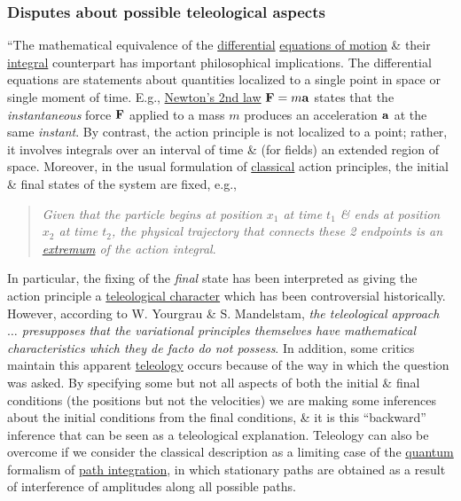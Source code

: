 \documentclass{article}
\begin{document}
\subsubsection{Disputes about possible teleological aspects}
``The mathematical equivalence of the \href{https://en.wikipedia.org/wiki/Differential_equation}{differential} \href{https://en.wikipedia.org/wiki/Equations_of_motion}{equations of motion} \& their \href{https://en.wikipedia.org/wiki/Integral_equation}{integral} counterpart has important philosophical implications. The differential equations are statements about quantities localized to a single point in space or single moment of time. E.g., \href{https://en.wikipedia.org/wiki/Newton%27s_laws_of_motion}{Newton's 2nd law} ${\bf F} = m{\bf a}$ states that the \textit{instantaneous} force ${\bf F}$ applied to a mass $m$ produces an acceleration ${\bf a}$ at the same \textit{instant}. By contrast, the action principle is not localized to a point; rather, it involves integrals over an interval of time \& (for fields) an extended region of space. Moreover, in the usual formulation of \href{https://en.wikipedia.org/wiki/Classical_physics}{classical} action principles, the initial \& final states of the system are fixed, e.g.,
\begin{quotation}
	\textit{Given that the particle begins at position $x_1$ at time $t_1$ \& ends at position $x_2$ at time $t_2$, the physical trajectory that connects these 2 endpoints is an \href{https://en.wikipedia.org/wiki/Extremum}{extremum} of the action integral}.
\end{quotation}
In particular, the fixing of the \textit{final} state has been interpreted as giving the action principle a \href{https://en.wikipedia.org/wiki/Teleology}{teleological character} which has been controversial historically. However, according to W. Yourgrau \& S. Mandelstam, \textit{the teleological approach $\ldots$ presupposes that the variational principles themselves have mathematical characteristics which they \emph{de facto} do not possess}. In addition, some critics maintain this apparent \href{https://en.wikipedia.org/wiki/Teleology}{teleology} occurs because of the way in which the question was asked. By specifying some but not all aspects of both the initial \& final conditions (the positions but not the velocities) we are making some inferences about the initial conditions from the final conditions, \& it is this ``backward'' inference that can be seen as a teleological explanation. Teleology can also be overcome if we consider the classical description as a limiting case of the \href{https://en.wikipedia.org/wiki/Quantum_mechanics}{quantum} formalism of \href{https://en.wikipedia.org/wiki/Path_integral_formulation}{path integration}, in which stationary paths are obtained as a result of interference of amplitudes along all possible paths.
\end{document}
